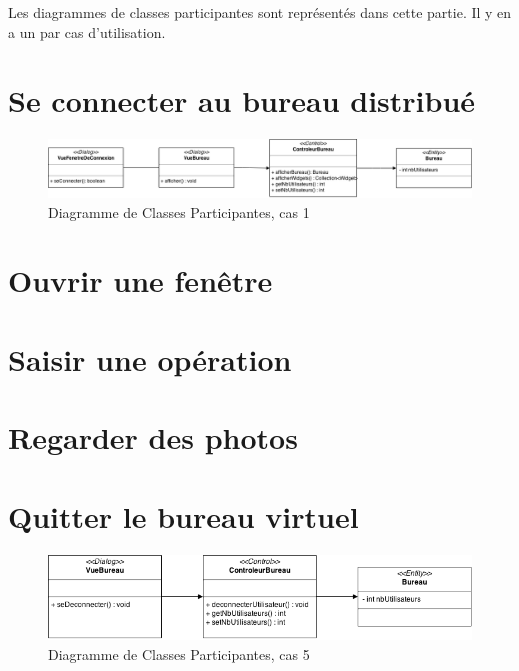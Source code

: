 Les diagrammes de classes participantes sont représentés dans cette 
partie. Il y en a un par cas d'utilisation.

\section{Se connecter au bureau distribué}

\begin{figure}[h!]
	\centering
	\includegraphics[scale=0.4]{diagrammes/DCP1.png}
	\caption{Diagramme de Classes Participantes, cas 1}
\end{figure}

\section{Ouvrir une fenêtre}


\section{Saisir une opération}


\section{Regarder des photos}


\section{Quitter le bureau virtuel}

\begin{figure}[h!]
	\centering
	\includegraphics[scale=0.4]{diagrammes/DCP5.png}
	\caption{Diagramme de Classes Participantes, cas 5}
\end{figure}